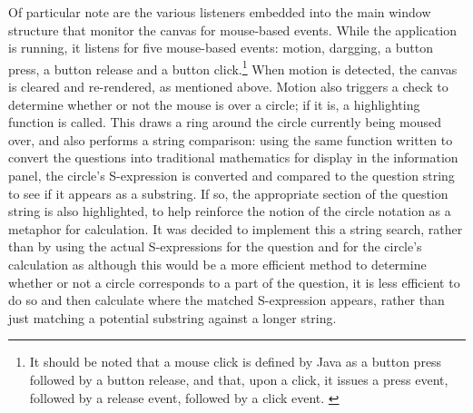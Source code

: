 \documentclass[12pt,twoside,notitlepage,xetex]{report}
\begin{document}
Of particular note are the various listeners embedded into the main window structure that monitor the canvas for mouse-based events.  While the application is running, it listens for five mouse-based events: motion, dargging, a button press, a button release and a button click.\footnote{It should be noted that a mouse click is defined by Java as a button press followed by a button release, and that, upon a click, it issues a press event, followed by a release event, followed by a click event. \cite{JavaApi}}  When motion is detected, the canvas is cleared and re-rendered, as mentioned above.  Motion also triggers a check to determine whether or not the mouse is over a circle; if it is, a highlighting function is called.  This draws a ring around the circle currently being moused over, and also performs a string comparison:  using the same function written to convert the questions into traditional mathematics for display in the information panel, the circle's S-expression is converted and compared to the question string to see if it appears as a substring.  If so, the appropriate section of the question string is also highlighted, to help reinforce the notion of the circle notation as a metaphor for calculation.  It was decided to implement this a string search, rather than by using the actual S-expressions for the question and for the circle's calculation as although this would be a more efficient method to determine whether or not a circle corresponds to a part of the question, it is less efficient to do so and then calculate where the matched S-expression appears, rather than just matching a potential substring against a longer string.
\end{document}
